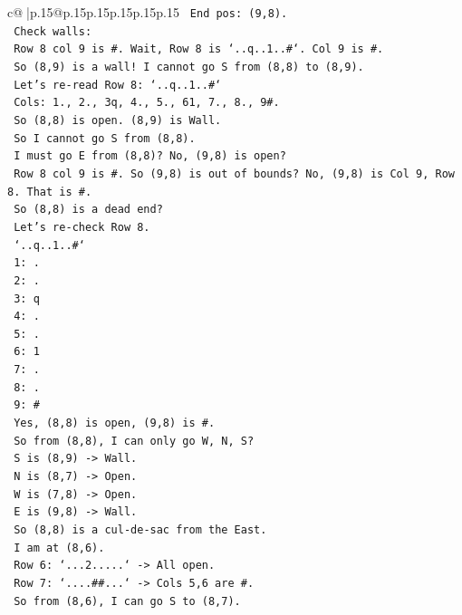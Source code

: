 \documentclass{article}
\begin{document}
{\begin{supertabular}{c@{$\;$}|p{.15\linewidth}@{}p{.15\linewidth}p{.15\linewidth}p{.15\linewidth}p{.15\linewidth}p{.15\linewidth}}
{{{\texttt{   End pos: (9,8).} \\
\texttt{   Check walls:} \\
\texttt{   Row 8 col 9 is \#. Wait, Row 8 is `..q..1..\#`. Col 9 is \#.} \\
\texttt{   So (8,9) is a wall! I cannot go S from (8,8) to (8,9).} \\
\texttt{   Let's re{-}read Row 8: `..q..1..\#`} \\
\texttt{   Cols: 1., 2., 3q, 4., 5., 61, 7., 8., 9\#.} \\
\texttt{   So (8,8) is open. (8,9) is Wall.} \\
\texttt{   So I cannot go S from (8,8).} \\
\texttt{   I must go E from (8,8)? No, (9,8) is open?} \\
\texttt{   Row 8 col 9 is \#. So (9,8) is out of bounds? No, (9,8) is Col 9, Row 8. That is \#.} \\
\texttt{   So (8,8) is a dead end?} \\
\texttt{   Let's re{-}check Row 8.} \\
\texttt{   `..q..1..\#`} \\
\texttt{   1: .} \\
\texttt{   2: .} \\
\texttt{   3: q} \\
\texttt{   4: .} \\
\texttt{   5: .} \\
\texttt{   6: 1} \\
\texttt{   7: .} \\
\texttt{   8: .} \\
\texttt{   9: \#} \\
\texttt{   Yes, (8,8) is open, (9,8) is \#.} \\
\texttt{   So from (8,8), I can only go W, N, S?} \\
\texttt{   S is (8,9) {-}> Wall.} \\
\texttt{   N is (8,7) {-}> Open.} \\
\texttt{   W is (7,8) {-}> Open.} \\
\texttt{   E is (9,8) {-}> Wall.} \\
\texttt{   So (8,8) is a cul{-}de{-}sac from the East.} \\
\texttt{   I am at (8,6).} \\
\texttt{   Row 6: `...2.....` {-}> All open.} \\
\texttt{   Row 7: `....\#\#...` {-}> Cols 5,6 are \#.} \\
\texttt{   So from (8,6), I can go S to (8,7).} \\
}}}
\end{supertabular}}
\end{document}
